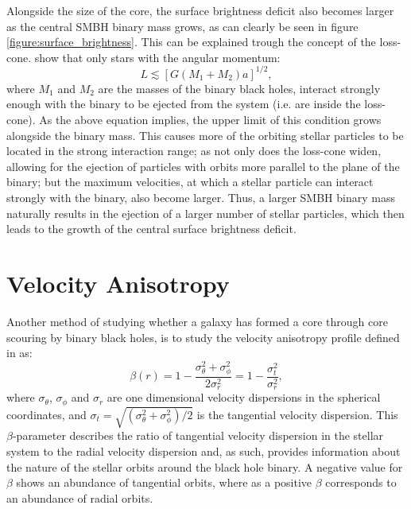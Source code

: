 \documentclass[english, oneside]{HYgradu}
\begin{document}
Alongside the size of the core, the surface brightness deficit also becomes larger as the central SMBH binary mass grows, as can clearly be seen in figure \ref{figure:surface_brightness}. This can be explained trough the concept of the loss-cone. \cite{BinneyTremaine} show that only stars with the angular momentum:
\begin{equation}
L \lesssim [G(M_1 + M_2)a]^{1/2}, \label{eq:loss-cone}
\end{equation}
where $M_1$ and $M_2$ are the masses of the binary black holes, interact strongly enough with the binary to be ejected from the system (i.e. are inside the loss-cone). As the above equation implies, the upper limit of this condition grows alongside the binary mass. This causes more of the orbiting stellar particles to be located in the strong interaction range; as not only does the loss-cone widen, allowing for the ejection of particles with orbits more parallel to the plane of the binary; but the maximum velocities, at which a stellar particle can interact strongly with the binary, also become larger. Thus, a larger SMBH binary mass naturally results in the ejection of a larger number of stellar particles, which then leads to the growth of the central surface brightness deficit.  

\section{Velocity Anisotropy}


Another method of studying whether a galaxy has formed a core through core scouring by binary black holes, is to study the velocity anisotropy profile defined in \cite{BinneyTremaine} as:
\begin{equation}
\beta(r) = 1 - \frac{\sigma_\theta^2 + \sigma_\phi^2}{2\sigma_r^2} = 1 - \frac{\sigma_t^2}{\sigma_r^2}, \label{eq:beta}
\end{equation}
where $\sigma_\theta$, $\sigma_\phi$ and $\sigma_r$ are one dimensional velocity dispersions in the spherical coordinates, and $\sigma_t = \sqrt{(\sigma_\theta^2 + \sigma_\phi^2) / 2}$ is the tangential velocity dispersion. This $\beta$-parameter describes the ratio of tangential velocity dispersion in the stellar system to the radial velocity dispersion and, as such, provides information about the nature of the stellar orbits around the black hole binary. A negative value for $\beta$ shows an abundance of tangential orbits, where as a positive $\beta$ corresponds to an abundance of radial orbits. 
\end{document}
